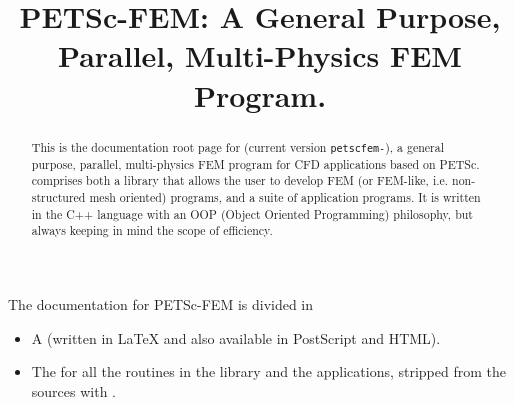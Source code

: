 \documentclass[11pt]{article}
\begin{document}
\sloppy

\title{PETSc-FEM: A General Purpose, Parallel, Multi-Physics FEM Program.}
\maketitle

\begin{abstract}
This is the documentation root page for \pfem (current version 
{\tt petscfem-\petscfemversion}), a general purpose, parallel,
multi-physics FEM program for CFD applications based on
PETSc. \pfem{} comprises both a library that allows the user to
develop FEM (or FEM-like, i.e. non-structured mesh oriented) programs, and
a suite of application programs. It is written in the C++ language
with an OOP (Object Oriented Programming) philosophy, but always
keeping in mind the scope of efficiency. 
\end{abstract}

The documentation for PETSc-FEM is divided in 

\begin{itemize}
\item A  (written
in \LaTeX{} and also available in PostScript and HTML).

\item The  for all the routines in the
library and the applications, stripped from the sources with
.
\end{itemize}
\end{document}
